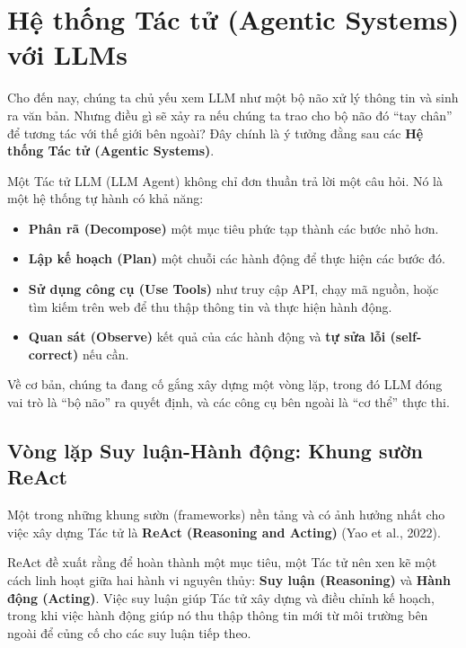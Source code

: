 
\section{Hệ thống Tác tử (Agentic Systems) với LLMs}
\label{sec:agentic_systems}

Cho đến nay, chúng ta chủ yếu xem LLM như một bộ não xử lý thông tin và sinh ra văn bản. Nhưng điều gì sẽ xảy ra nếu chúng ta trao cho bộ não đó “tay chân” để tương tác với thế giới bên ngoài? Đây chính là ý tưởng đằng sau các \textbf{Hệ thống Tác tử (Agentic Systems)}.

Một Tác tử LLM (LLM Agent) không chỉ đơn thuần trả lời một câu hỏi. Nó là một hệ thống tự hành có khả năng:
\begin{itemize}
    \item \textbf{Phân rã (Decompose)} một mục tiêu phức tạp thành các bước nhỏ hơn.
    \item \textbf{Lập kế hoạch (Plan)} một chuỗi các hành động để thực hiện các bước đó.
    \item \textbf{Sử dụng công cụ (Use Tools)} như truy cập API, chạy mã nguồn, hoặc tìm kiếm trên web để thu thập thông tin và thực hiện hành động.
    \item \textbf{Quan sát (Observe)} kết quả của các hành động và \textbf{tự sửa lỗi (self-correct)} nếu cần.
\end{itemize}

Về cơ bản, chúng ta đang cố gắng xây dựng một vòng lặp, trong đó LLM đóng vai trò là “bộ não” ra quyết định, và các công cụ bên ngoài là “cơ thể” thực thi.

\subsection{Vòng lặp Suy luận-Hành động: Khung sườn ReAct}
\label{ssec:react_framework}

Một trong những khung sườn (frameworks) nền tảng và có ảnh hưởng nhất cho việc xây dựng Tác tử là \textbf{ReAct (Reasoning and Acting)} (Yao et al., 2022).

\begin{tcolorbox}[
    title=Triết lý của ReAct,
    colback=green!5!white, colframe=green!60!black, fonttitle=\bfseries
]
ReAct đề xuất rằng để hoàn thành một mục tiêu, một Tác tử nên xen kẽ một cách linh hoạt giữa hai hành vi nguyên thủy: \textbf{Suy luận (Reasoning)} và \textbf{Hành động (Acting)}. Việc suy luận giúp Tác tử xây dựng và điều chỉnh kế hoạch, trong khi việc hành động giúp nó thu thập thông tin mới từ môi trường bên ngoài để củng cố cho các suy luận tiếp theo.
\end{tcolorbox}

